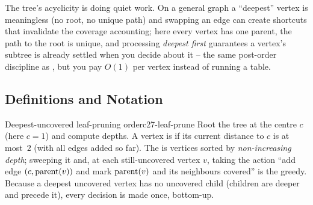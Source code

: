 The tree's acyclicity is doing quiet work. On a general graph a ``deepest'' vertex
is meaningless (no root, no unique path) and swapping an edge can create shortcuts
that invalidate the coverage accounting; here every vertex has one parent, the path
to the root is unique, and processing \emph{deepest first} guarantees a vertex's
subtree is already settled when you decide about it -- the same post-order discipline
as , but you pay $O(1)$ per vertex instead of running a table.

\subsection{Definitions and Notation}

\begin{definition}{Deepest-uncovered leaf-pruning order}{c27-leaf-prune}
Root the tree at the centre $c$ (here $c = 1$) and compute depths. A vertex is
 if its current distance to $c$ is at most~$2$ (with all edges added
so far). The  is vertices sorted by \emph{non-increasing
depth}; sweeping it and, at each still-uncovered vertex $v$, taking the action
``add edge $(c, \operatorname{parent}(v))$ and mark $\operatorname{parent}(v)$ and its neighbours covered''
is the greedy. Because a deepest uncovered vertex has no uncovered child (children
are deeper and precede it), every decision is made once, bottom-up.
\end{definition}

